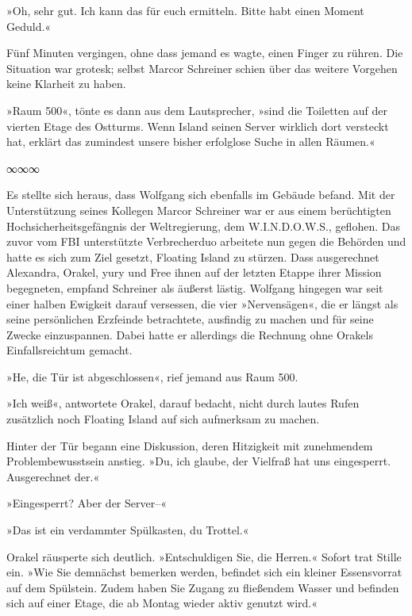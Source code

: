 »Oh, sehr gut. Ich kann das für euch ermitteln. Bitte habt einen Moment Geduld.«

Fünf Minuten vergingen, ohne dass jemand es wagte, einen Finger zu rühren. Die Situation war grotesk; selbst Marcor Schreiner schien über das weitere Vorgehen keine Klarheit zu haben.

»Raum 500«, tönte es dann aus dem Lautsprecher, »sind die Toiletten auf der vierten Etage des Ostturms. Wenn Island seinen Server wirklich dort versteckt hat, erklärt das zumindest unsere bisher erfolglose Suche in allen Räumen.«

\begin{center}
	∞∞∞
\end{center}

Es stellte sich heraus, dass Wolfgang sich ebenfalls im Gebäude befand. Mit der Unterstützung seines Kollegen Marcor Schreiner war er aus einem berüchtigten Hochsicherheitsgefängnis der Weltregierung, dem W.I.N.D.O.W.S., geflohen. Das zuvor vom FBI unterstützte Verbrecherduo arbeitete nun gegen die Behörden und hatte es sich zum Ziel gesetzt, Floating Island zu stürzen. Dass ausgerechnet Alexandra, Orakel, yury und Free ihnen auf der letzten Etappe ihrer Mission begegneten, empfand Schreiner als äußerst lästig. Wolfgang hingegen war seit einer halben Ewigkeit darauf versessen, die vier »Nervensägen«, die er längst als seine persönlichen Erzfeinde betrachtete, ausfindig zu machen und für seine Zwecke einzuspannen. Dabei hatte er allerdings die Rechnung ohne Orakels Einfallsreichtum gemacht.

»He, die Tür ist abgeschlossen«, rief jemand aus Raum 500.

»Ich weiß«, antwortete Orakel, darauf bedacht, nicht durch lautes Rufen zusätzlich noch Floating Island auf sich aufmerksam zu machen.

Hinter der Tür begann eine Diskussion, deren Hitzigkeit mit zunehmendem Problembewusstsein anstieg. »Du, ich glaube, der Vielfraß hat uns eingesperrt. Ausgerechnet der.«

»Eingesperrt? Aber der Server–«

»Das ist ein verdammter Spülkasten, du Trottel.«

Orakel räusperte sich deutlich. »Entschuldigen Sie, die Herren.« Sofort trat Stille ein. »Wie Sie demnächst bemerken werden, befindet sich ein kleiner Essensvorrat auf dem Spülstein. Zudem haben Sie Zugang zu fließendem Wasser und befinden sich auf einer Etage, die ab Montag wieder aktiv genutzt wird.«

